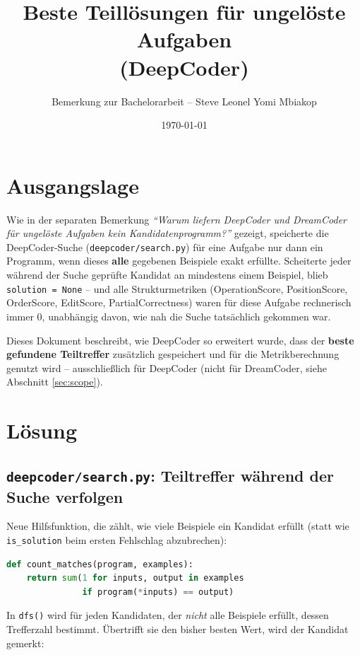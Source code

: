 \documentclass[11pt,a4paper]{article}
\title{Beste Teillösungen für ungelöste Aufgaben\\ (DeepCoder)}
\author{Bemerkung zur Bachelorarbeit -- Steve Leonel Yomi Mbiakop}
\date{\today}
\begin{document}
\maketitle

\section{Ausgangslage}

Wie in der separaten Bemerkung \emph{``Warum liefern DeepCoder und
DreamCoder für ungelöste Aufgaben kein Kandidatenprogramm?''} gezeigt,
speicherte die DeepCoder-Suche (\texttt{deepcoder/search.py}) für eine
Aufgabe nur dann ein Programm, wenn dieses \textbf{alle} gegebenen
Beispiele exakt erfüllte. Scheiterte jeder während der Suche geprüfte
Kandidat an mindestens einem Beispiel, blieb \texttt{solution = None} --
und alle Strukturmetriken (OperationScore, PositionScore, OrderScore,
EditScore, PartialCorrectness) waren für diese Aufgabe rechnerisch immer
$0$, unabhängig davon, wie nah die Suche tatsächlich gekommen war.

Dieses Dokument beschreibt, wie DeepCoder so erweitert wurde, dass der
\textbf{beste gefundene Teiltreffer} zusätzlich gespeichert und für die
Metrikberechnung genutzt wird -- ausschließlich für DeepCoder (nicht für
DreamCoder, siehe Abschnitt \ref{sec:scope}).

\section{Lösung}

\subsection{\texttt{deepcoder/search.py}: Teiltreffer während der Suche verfolgen}

Neue Hilfsfunktion, die zählt, wie viele Beispiele ein Kandidat erfüllt
(statt wie \texttt{is\_solution} beim ersten Fehlschlag abzubrechen):

\begin{lstlisting}[language=Python]
def count_matches(program, examples):
    return sum(1 for inputs, output in examples
               if program(*inputs) == output)
\end{lstlisting}

In \texttt{dfs()} wird für jeden Kandidaten, der \emph{nicht} alle
Beispiele erfüllt, dessen Trefferzahl bestimmt. Übertrifft sie den
bisher besten Wert, wird der Kandidat gemerkt:
\end{document}

